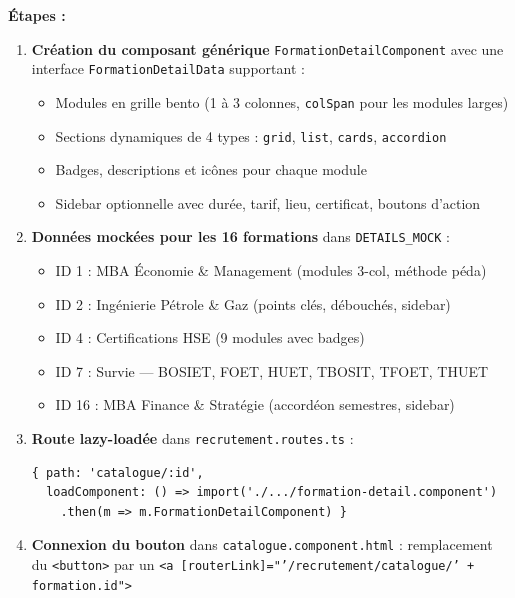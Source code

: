 \documentclass[a4paper,12pt,french]{article}
\begin{document}
\begin{solutionbox}
\textbf{Étapes :}

\begin{enumerate}
    \item \textbf{Création du composant générique} \texttt{FormationDetailComponent} avec une interface \texttt{FormationDetailData} supportant :
    \begin{itemize}
        \item Modules en grille bento (1 à 3 colonnes, \texttt{colSpan} pour les modules larges)
        \item Sections dynamiques de 4 types : \texttt{grid}, \texttt{list}, \texttt{cards}, \texttt{accordion}
        \item Badges, descriptions et icônes pour chaque module
        \item Sidebar optionnelle avec durée, tarif, lieu, certificat, boutons d'action
    \end{itemize}
    
    \item \textbf{Données mockées pour les 16 formations} dans \texttt{DETAILS\_MOCK} :
    \begin{itemize}
        \item ID 1 : MBA Économie \& Management (modules 3-col, méthode péda)
        \item ID 2 : Ingénierie Pétrole \& Gaz (points clés, débouchés, sidebar)
        \item ID 4 : Certifications HSE (9 modules avec badges)
        \item ID 7 : Survie — BOSIET, FOET, HUET, TBOSIT, TFOET, THUET
        \item ID 16 : MBA Finance \& Stratégie (accordéon semestres, sidebar)
    \end{itemize}
    
    \item \textbf{Route lazy-loadée} dans \texttt{recrutement.routes.ts} :
    \begin{lstlisting}[style=tsstyle]
{ path: 'catalogue/:id',
  loadComponent: () => import('./.../formation-detail.component')
    .then(m => m.FormationDetailComponent) }
    \end{lstlisting}
    
    \item \textbf{Connexion du bouton} dans \texttt{catalogue.component.html} : remplacement du \texttt{<button>} par un \texttt{<a [routerLink]="'/recrutement/catalogue/' + formation.id">}
\end{enumerate}
\end{solutionbox}
\end{document}
